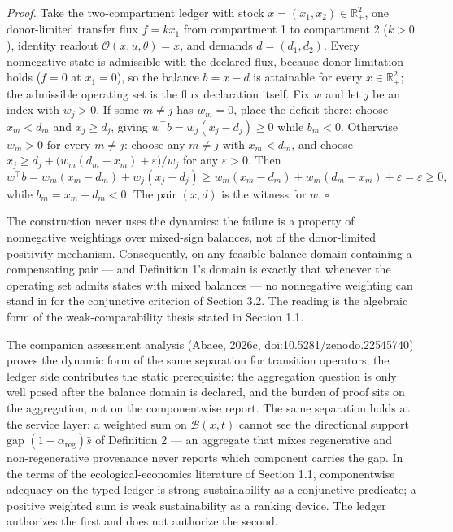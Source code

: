 \documentclass[11pt]{article}
\begin{document}
\emph{Proof.} Take the two-compartment ledger with stock
\(x = (x_1, x_2) \in \mathbb{R}^2_+\), one donor-limited transfer flux
\(f = kx_1\) from compartment 1 to compartment 2 (\(k > 0\)), identity
readout \(\mathcal{O}(x, u, \theta) = x\), and demands
\(d = (d_1, d_2)\). Every nonnegative state is admissible with the
declared flux, because donor limitation holds (\(f = 0\) at
\(x_1 = 0\)), so the balance \(b = x - d\) is attainable for every
\(x \in \mathbb{R}^2_+\); the admissible operating set is the flux
declaration itself. Fix \(w\) and let \(j\) be an index with
\(w_j > 0\). If some \(m \neq j\) has \(w_m = 0\), place the deficit
there: choose \(x_m < d_m\) and \(x_j \ge d_j\), giving
\(w^\top b = w_j (x_j - d_j) \ge 0\) while \(b_m < 0\). Otherwise
\(w_m > 0\) for every \(m \neq j\): choose any \(m \neq j\) with
\(x_m < d_m\), and choose
\(x_j \ge d_j + \bigl( w_m (d_m - x_m) + \varepsilon \bigr)/w_j\) for
any \(\varepsilon > 0\). Then
\[w^\top b = w_m (x_m - d_m) + w_j (x_j - d_j) \ge w_m (x_m - d_m) + w_m (d_m - x_m) + \varepsilon = \varepsilon \ge 0,\]
while \(b_m = x_m - d_m < 0\). The pair \((x, d)\) is the witness for
\(w\). \ensuremath{\square}

The construction never uses the dynamics: the failure is a property of
nonnegative weightings over mixed-sign balances, not of the
donor-limited positivity mechanism. Consequently, on any feasible
balance domain containing a compensating pair --- and Definition 1's
domain is exactly that whenever the operating set admits states with
mixed balances --- no nonnegative weighting can stand in for the
conjunctive criterion of Section 3.2. The reading is the algebraic form
of the weak-comparability thesis stated in Section 1.1.

The companion assessment analysis (Abaee, 2026c, doi:10.5281/zenodo.22545740) proves
the dynamic form of the same separation for transition operators; the
ledger side contributes the static prerequisite: the aggregation
question is only well posed after the balance domain is declared, and
the burden of proof sits on the aggregation, not on the componentwise
report. The same separation holds at the service layer: a weighted sum
on \(\mathcal{B}(x,t)\) cannot see the directional support gap
\((1 - \alpha_{\mathrm{reg}})\bar s\) of Definition 2 --- an aggregate
that mixes regenerative and non-regenerative provenance never reports
which component carries the gap. In the terms of the
ecological-economics literature of Section 1.1, componentwise adequacy
on the typed ledger is strong sustainability as a conjunctive predicate;
a positive weighted sum is weak sustainability as a ranking device. The
ledger authorizes the first and does not authorize the second.
\end{document}
